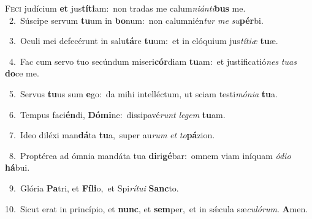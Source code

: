 \lettrine{\initial\textcolor{\initialcolor}{F}}{eci} judícium \textbf{et} jus\-\textbf{tí}\-\textbf{ti}am:~\star non tradas me calum\-\textit{ni}\-\textit{án}\textit{ti}\textbf{bus} me.\\
{\numbfont\textcolor{\numbcolor}{~2.}}~Súscipe servum \textbf{tu}\-um in \textbf{bo}\-num:~\star non calumnién\textit{tur} \textit{me} \textit{su}\-\textbf{pér}bi.\par
{\numbfont\textcolor{\numbcolor}{~3.}}~Oculi mei defecérunt in salu\-\textbf{tá}\-re \textbf{tu}\-um:~\star et in elóquium jus\-\textit{tí}\-\textit{ti}\textit{æ} \textbf{tu}\-æ.\par
{\numbfont\textcolor{\numbcolor}{~4.}}~Fac cum servo tuo secúndum miseri\-\textbf{cór}\-diam \textbf{tu}\-am:~\star et justificatió\textit{nes} \textit{tu}\-\textit{as} \textbf{do}\-ce me.\par
{\numbfont\textcolor{\numbcolor}{~5.}}~Servus \textbf{tu}\-us sum \textbf{e}\-go:~\star da mihi intelléctum, ut sciam testi\-\textit{mó}\-\textit{ni}\textit{a} \textbf{tu}\-a.\par
{\numbfont\textcolor{\numbcolor}{~6.}}~Tempus faci\-\textbf{én}\-di, \textbf{Dó}\-\textbf{mi}ne:~\star dissipavé\textit{runt} \textit{le}\-\textit{gem} \textbf{tu}\-am.\par
{\numbfont\textcolor{\numbcolor}{~7.}}~Ideo diléxi man\-\textbf{dá}\-ta \textbf{tu}\-a,~\star super au\textit{rum} \textit{et} \textit{to}\-\textbf{pá}zion.\par
{\numbfont\textcolor{\numbcolor}{~8.}}~Proptérea ad ómnia mandáta tua \textbf{di}\-ri\-\textbf{gé}\-bar:~\star omnem viam iníquam \textit{ó}\-\textit{di}\textit{o} \textbf{há}\-bui.\par
{\numbfont\textcolor{\numbcolor}{~9.}}~Glória \textbf{Pa}\-tri, et \textbf{Fí}\-\textbf{li}o,~\star et Spi\-\textit{rí}\-\textit{tu}\textit{i} \textbf{Sanc}\-to.\par
{\numbfont\textcolor{\numbcolor}{10.}}~Sicut erat in princípio, et \textbf{nunc}\-, et \textbf{sem}\-per,~\star et in sǽcula sæ\-\textit{cu}\-\textit{ló}\textit{rum}. \textbf{A}\-men.\par
